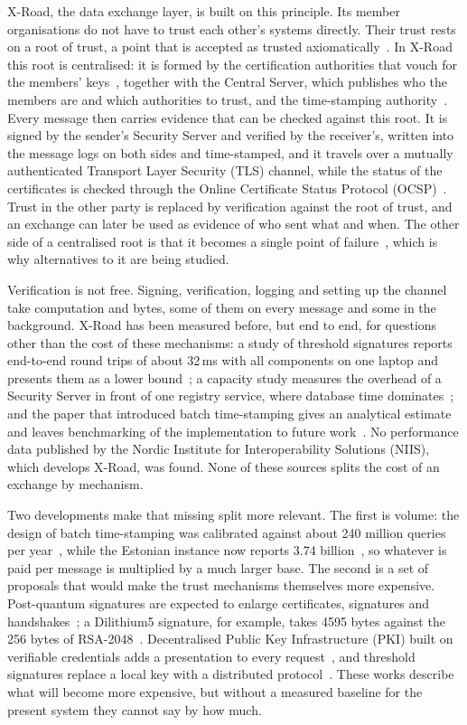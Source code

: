 \documentclass[conference,a4paper]{IEEEtran}
\begin{document}
X-Road, the data exchange layer, is built on this principle. Its member organisations do not have to trust each other's
systems directly. Their trust rests on a root of trust, a point that is accepted as trusted
axiomatically~\cite{bakhtina2023sac}. In X-Road this root is centralised: it is formed by the
certification authorities that vouch for the members' keys~\cite{bakhtina2023sac}, together with the
Central Server, which publishes who the members are and which authorities to trust, and the
time-stamping authority~\cite{xroadarcss}. Every message then carries evidence that can be checked
against this root. It is signed by the sender's Security Server and verified by the receiver's,
written into the message logs on both sides and time-stamped, and it travels over a mutually
authenticated Transport Layer Security (TLS) channel, while the status of the certificates is checked
through the Online Certificate Status Protocol (OCSP)~\cite{xroadarcss,ansper2013}. Trust in the other
party is replaced by verification against the root of trust, and an exchange can later be used as
evidence of who sent what and when. The other side of a centralised root is that it becomes a single
point of failure~\cite{bakhtina2023sac}, which is why alternatives to it are being studied.

Verification is not free. Signing, verification, logging and setting up the channel take
computation and bytes, some of them on every message and some in the background. X-Road has been
measured before, but end to end, for questions other than the cost of these mechanisms: a
study of threshold signatures reports end-to-end round trips of about 32\,ms with all components on
one laptop and presents them as a lower bound~\cite{bakhtina2026ijis}; a capacity study measures the
overhead of a Security Server in front of one registry service, where database time
dominates~\cite{taklai2020}; and the paper that introduced batch time-stamping gives an analytical
estimate and leaves benchmarking of the implementation to future work~\cite{ansper2013}. No performance
data published by the Nordic Institute for Interoperability Solutions (NIIS), which develops X-Road,
was found. None of these sources splits the cost of an exchange by mechanism.

Two developments make that missing split more relevant. The first is volume: the design of batch
time-stamping was calibrated against about 240 million queries per year~\cite{ansper2013}, while the
Estonian instance now reports 3.74 billion~\cite{xteefactsheet}, so whatever is paid per message is
multiplied by a much larger base. The second is a set of proposals that would make the trust
mechanisms themselves more expensive. Post-quantum signatures are expected to enlarge certificates,
signatures and handshakes~\cite{bakhtina2026pqc,snetkov2023}; a Dilithium5 signature, for example,
takes 4595 bytes against the 256 bytes of RSA-2048~\cite{snetkov2023}. Decentralised Public Key
Infrastructure (PKI) built on verifiable credentials adds a presentation to every
request~\cite{bakhtina2023ares}, and threshold signatures replace a local key with a distributed
protocol~\cite{bakhtina2026ijis}. These works describe what will become more expensive, but without a
measured baseline for the present system they cannot say by how much.
\end{document}
